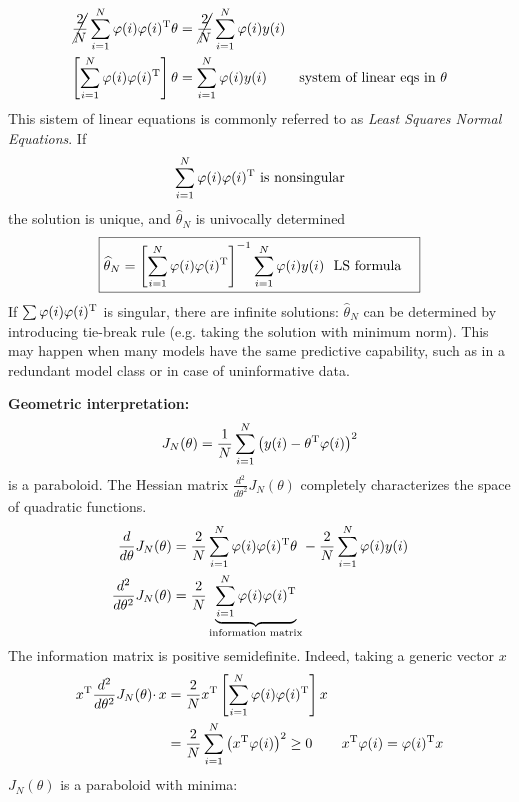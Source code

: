 \begin{equation*}
\begin{aligned}
\cancel{\frac{2}{N}}\sum _{i=1}^{N} \varphi (i) \varphi (i)^{\mathrm{T}} \theta  & =\cancel{\frac{2}{N}}\sum _{i=1}^{N} \varphi (i) y(i) & \\
\left[\sum _{i=1}^{N} \varphi (i) \varphi (i)^{\mathrm{T}}\right] \theta  & =\sum _{i=1}^{N} \varphi (i) y(i) & \text{system of linear eqs in} \ \theta 
\end{aligned}
\end{equation*}
This sistem of linear equations is commonly referred to as \textit{Least Squares Normal Equations}. If 
\begin{equation*}
\sum _{i=1}^{N} \varphi (i) \varphi (i)^{\mathrm{T}} \ \text{is nonsingular}
\end{equation*}
the solution is unique, and $ \hat{\theta }_{N}$ is univocally determined
\begin{equation*}
\boxed{\begin{aligned}
\hat{\theta }_{N} =\left[\sum _{i=1}^{N} \varphi (i) \varphi (i)\transpose\right]^{-1}\sum _{i=1}^{N} \varphi (i) y(i) & \ \ \mathbf{\text{LS formula}}
\end{aligned}}
\end{equation*}
If $ \sum \varphi (i) \varphi (i)^{\mathrm{T}}$ is singular, there are infinite solutions: $ \hat{\theta }_{N}$ can be determined by introducing tie-break rule (e.g. taking the solution with minimum norm). This may happen when many models have the same predictive capability, such as in a redundant model class or in case of uninformative data.

\textbf{Geometric interpretation:}
\begin{equation*}
J_{N}(\theta) =\frac{1}{N}\sum _{i=1}^{N}\left(y(i) -\theta ^{\mathrm{T}} \varphi (i)\right)^{2}
\end{equation*}
is a paraboloid. The Hessian matrix $ \frac{d^{2}}{d\theta ^{2}} J_{N}(\theta)$ completely characterizes the space of quadratic functions.
\begin{equation*}
\begin{aligned}
\frac{d}{d\theta } J_{N}(\theta) & =\frac{2}{N}\sum _{i=1}^{N} \varphi (i) \varphi (i)^{\mathrm{T}} \theta \ -\frac{2}{N}\sum _{i=1}^{N} \varphi (i) y(i)\\
\frac{d^{2}}{d\theta ^{2}} J_{N}(\theta) & =\frac{2}{N}\underbrace{\sum _{i=1}^{N} \varphi (i) \varphi (i)^{\mathrm{T}}}_{\text{information matrix}}
\end{aligned}
\end{equation*}
The information matrix is positive semidefinite. Indeed, taking a generic vector $ x$
\begin{equation*}
\begin{aligned}
x^{\mathrm{T}}\frac{d^{2}}{d\theta ^{2}} J_{N}(\theta) \cdotp x & =\frac{2}{N} x^{\mathrm{T}}\left[\sum _{i=1}^{N} \varphi (i) \varphi (i)^{\mathrm{T}}\right] x & \\
 & =\frac{2}{N}\sum _{i=1}^{N}\left(x^{\mathrm{T}} \varphi (i)\right)^{2} \geq 0 & x^{\mathrm{T}} \varphi (i) =\varphi (i)^{\mathrm{T}} x
\end{aligned}
\end{equation*}
$ J_{N}(\theta)$ is a paraboloid with minima:

